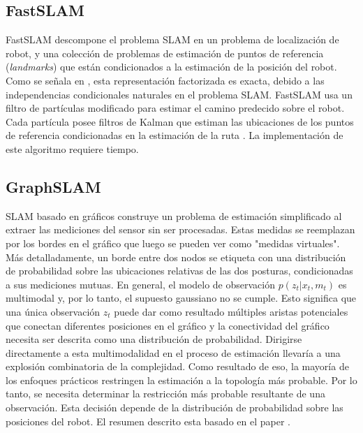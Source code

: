 \subsection{FastSLAM}
FastSLAM descompone el problema SLAM en un problema de localizaci\'on de robot, y una colecci\'on 
de problemas de estimaci\'on de puntos de referencia (\textit{landmarks}) que est\'an condicionados 
a la estimaci\'on de la posici\'on del robot. Como se se\~nala en \cite{murphy2000bayesian}, esta 
representaci\'on factorizada es exacta, debido a las independencias condicionales naturales en el 
problema SLAM. FastSLAM usa un filtro de part\'iculas modificado para estimar el camino predecido 
sobre el robot. Cada part\'icula posee filtros de Kalman que estiman las ubicaciones de los puntos 
de referencia condicionadas en la estimaci\'on de la ruta \cite{montemerlo2007fastslam}. La 
implementaci\'on de este algoritmo requiere tiempo.

\subsection{GraphSLAM}
SLAM basado en gr\'aficos construye un problema de estimaci\'on simplificado al extraer las mediciones 
del sensor sin ser procesadas. Estas medidas se reemplazan por los bordes en el gr\'afico que luego 
se pueden ver como "medidas virtuales". M\'as detalladamente, un borde entre dos nodos se etiqueta 
con una distribuci\'on de probabilidad sobre las ubicaciones relativas de las dos posturas, 
condicionadas a sus mediciones mutuas. En general, el modelo de observaci\'on $p(z_{t}| x_{t},  
m_{t})$ es multimodal y, por lo tanto, el supuesto gaussiano no se cumple. Esto significa que una 
\'unica observaci\'on $z_{t}$ puede dar como resultado m\'ultiples aristas potenciales que 
conectan diferentes posiciones en el gr\'afico y la conectividad del gr\'afico necesita ser descrita 
como una distribuci\'on de probabilidad. 
Dirigirse directamente a esta multimodalidad en el proceso de estimaci\'on llevar\'ia a una explosi\'on 
combinatoria de la complejidad. Como resultado de eso, la mayor\'ia de los enfoques pr\'acticos restringen 
la estimaci\'on a la topolog\'ia m\'as probable. Por lo tanto, se necesita determinar la restricci\'on 
m\'as probable resultante de una observaci\'on. Esta decisi\'on depende de la distribuci\'on de 
probabilidad sobre las posiciones del robot. El resumen descrito esta basado en el paper 
\cite{grisetti2010tutorial}.


